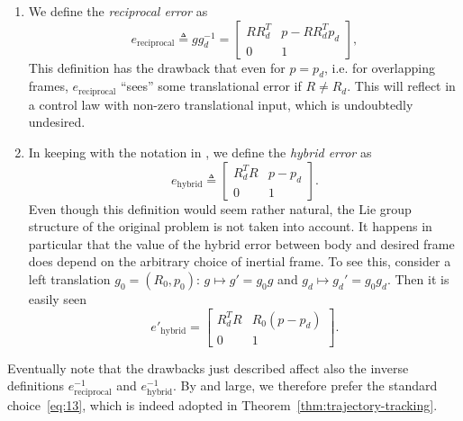 \documentclass[10pt,twocolumn]{article}
\begin{document}
\begin{enumerate}[leftmargin=1.7em,itemsep=0.6em]
\item We define the \emph{reciprocal error} as
\begin{equation*}
e_{\mathrm{reciprocal}}\triangleq gg_d^{-1}
=\begin{bmatrix}
RR_d^T&p-RR_d^Tp_d\\
0&1
\end{bmatrix},
\end{equation*}
This definition has the drawback that even for $p=p_d$, i.e. for overlapping frames, $e_{\mathrm{reciprocal}}$ ``sees'' some translational error if $R\neq R_d$. This will reflect in a control law with non-zero translational input, which is undoubtedly undesired.

\item In keeping with the notation in \cite{1}, we define the \emph{hybrid error} as
\begin{equation*}
e_{\mathrm{hybrid}}\triangleq
\begin{bmatrix}
R_d^TR&p-p_d\\
0&1
\end{bmatrix}.
\end{equation*}
Even though this definition would seem rather natural, the Lie group structure of the original problem is not taken into account. It happens in particular that the value of the hybrid error between body and desired frame does depend on the arbitrary choice of inertial frame. To see this, consider a left translation $g_0=(R_0,p_0)$: $g\mapsto g'=g_0g$ and $g_d\mapsto g_d'=g_0g_d$. Then it is easily seen
\begin{equation*}
e'_{\mathrm{hybrid}}=
\begin{bmatrix}
R_d^TR&R_0(p-p_d)\\
0&1
\end{bmatrix}.
\end{equation*}
\end{enumerate}
Eventually note that the drawbacks just described affect also the inverse definitions $e_{\mathrm{reciprocal}}^{-1}$ and $e_{\mathrm{hybrid}}^{-1}$. By and large, we therefore prefer the standard choice~\eqref{eq:13}, which is indeed adopted in Theorem~\ref{thm:trajectory-tracking}.
\end{document}
